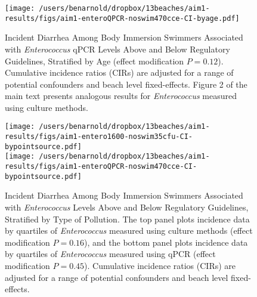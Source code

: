 \documentclass[12pt]{article}\usepackage[]{graphicx}\usepackage[]{color}
\begin{document}
\begin{figure}
\begin{center}
\texttt{[image: /users/benarnold/dropbox/13beaches/aim1-results/figs/aim1-enteroQPCR-noswim470cce-CI-byage.pdf]} \\
\caption{Incident Diarrhea Among Body Immersion Swimmers Associated with \textit{Enterococcus} qPCR Levels Above and Below Regulatory Guidelines, Stratified by Age (effect modification $P=0.12$). Cumulative incidence ratios (CIRs) are adjusted for a range of potential confounders and beach level fixed-effects. Figure 2 of the main text presents analogous results for \textit{Enterococcus} measured using culture methods. \label{fig:enteroQCPRage}}
\end{center}
\end{figure}


\begin{figure}
\begin{center}
\texttt{[image: /users/benarnold/dropbox/13beaches/aim1-results/figs/aim1-entero1600-noswim35cfu-CI-bypointsource.pdf]} \\
\texttt{[image: /users/benarnold/dropbox/13beaches/aim1-results/figs/aim1-enteroQPCR-noswim470cce-CI-bypointsource.pdf]}
\caption{Incident Diarrhea Among Body Immersion Swimmers Associated with \textit{Enterococcus} Levels Above and Below Regulatory Guidelines, Stratified by Type of Pollution. The top panel plots incidence data by quartiles of \textit{Enterococcus} measured using culture methods (effect modification $P=0.16$), and the bottom panel plots incidence data by quartiles of \textit{Enterococcus} measured using qPCR (effect modification $P=0.45$).  Cumulative incidence ratios (CIRs) are adjusted for a range of potential confounders and beach level fixed-effects. \label{fig:enteropol}}
\end{center}
\end{figure}



\clearpage
\end{document}

